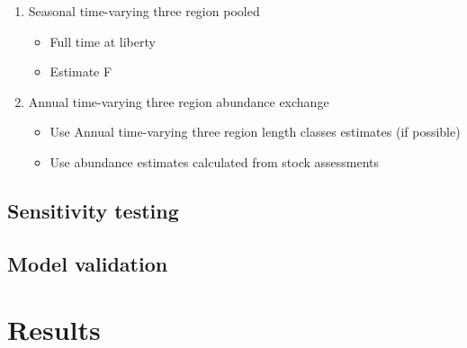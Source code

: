 \documentclass{article}
\begin{document}
\begin{enumerate}
    \item Seasonal time-varying three region pooled
    \begin{itemize}
        \item Full time at liberty
        \item Estimate F
    \end{itemize}
    \item Annual time-varying three region abundance exchange
    \begin{itemize}
        \item Use Annual time-varying three region length classes estimates (if possible)
        \item Use abundance estimates calculated from stock assessments
    \end{itemize}    
\end{enumerate}



\subsection{Sensitivity testing}

\subsection{Model validation}


\section{Results}
\end{document}
